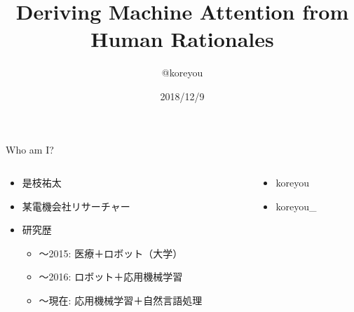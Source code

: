 

\title{Deriving Machine Attention from Human Rationales}
\author{@koreyou}
\date[]{2018/12/9}




\frame{\titlepage}

\begin{frame}{Who am I?}
  \begin{columns}[onlytextwidth]
  \begin{column}{0.68\linewidth}
    \begin{itemize}
      \item 是枝祐太
      \item 某電機会社リサーチャー
      \item 研究歴
      \begin{itemize}
        \item 〜2015: 医療＋ロボット（大学）
        \item 〜2016: ロボット＋応用機械学習
        \item 〜現在: 応用機械学習＋自然言語処理
      \end{itemize}
    \end{itemize}
  \end{column}
  \begin{column}{0.3\linewidth}
    \begin{itemize}
      \item[]  koreyou
      \item[]  koreyou\_
    \end{itemize}
    \vspace*{10mm}
  \end{column}
  \end{columns}
\end{frame}

